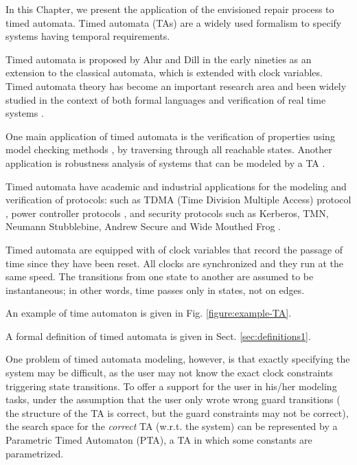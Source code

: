 \begin{tikzborder}{\cite{Gargantini16:validation}}
\begin{tikzborder}{\cite{gargantini_combinatorial_2017}}
\begin{tikzborder}{\cite{gargantini_combinatorial_2017}}
\begin{tikzborder}{\cite{garn2019}}
\begin{tikzborder}{\cite{arcaini2019achieving}}
\begin{tikzborder}{\cite{arcaini2019varivolution}}
In this Chapter, we present the application of the envisioned repair process to timed automata.
Timed automata (TAs) \cite{AD94} are a widely used formalism to specify systems having temporal requirements.

Timed automata is proposed by Alur and Dill \cite{AD94} in the early nineties as an extension to the classical automata, which is extended with clock variables. 
Timed automata theory has become an important research area and been widely studied in the context of both formal languages and verification of real time systems \cite{5521565}.

One main application of timed automata is the verification of properties using model checking methods \cite{clarke_model_checking}, by traversing through all reachable states.
Another application is robustness analysis of systems that can be modeled by a TA \cite{markey2011robustness}.

Timed automata have academic and industrial applications for the modeling and verification of protocols: such as TDMA (Time Division Multiple Access) protocol \cite{tdma}, power controller protocols \cite{havelund_power_controller_1999}, and security protocols such as Kerberos, TMN, Neumann Stubblebine, Andrew Secure and Wide Mouthed Frog \cite{jakubowska2005verifying,jakubowska2007modelling}.

Timed automata are equipped with of clock variables that record the passage of time since they have been reset. All clocks are synchronized and they run at the same speed. 
The transitions from one state to another are assumed to be instantaneous; in other words, time passes only in states, not on edges.

An example of time automaton is given in Fig. \ref{figure:example-TA}.%

A formal definition of timed automata is given in Sect. \ref{sec:definitions1}.

One problem of timed automata modeling, however, is that exactly specifying the system may be difficult, as the user may not know the exact clock constraints triggering state transitions.
To offer a support for the user in his/her modeling tasks, %
under the assumption that the user only wrote wrong guard transitions (\ie{} the structure of the TA is correct, but the guard constraints may not be correct), the search space for the \textit{correct} TA (w.r.t. the system) can be represented by a Parametric Timed Automaton (PTA), \ie{} a TA in which some constants are parametrized.


\end{tikzborder}
\end{tikzborder}
\end{tikzborder}
\end{tikzborder}
\end{tikzborder}
\end{tikzborder}
